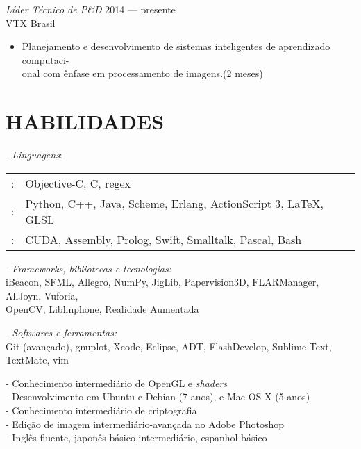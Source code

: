 \documentclass[]{res} %
\newcommand{\sbt}{\,\begin{picture}(-1,1)(-2,-3)\circle*{2}\end{picture}\ }
\def \divspace{6pt}
\def \myitemback{0.55cm}
\def \myitemsep{0pt}
\def \mypositionface{\sl}
\def \myorgface{\sc}
\begin{document}
\begin{resume}
{\mypositionface Líder Técnico de P\&D} \hfill 2014 — presente \\
{\myorgface VTX Brasil}

\begin{itemize}[itemsep=\myitemsep,leftmargin=\myitemback]
\item[\sbt] Planejamento e desenvolvimento de sistemas inteligentes de aprendizado computaci-\\onal com ênfase em processamento de imagens.\hfill(2 meses)
\end{itemize}


\section{HABILIDADES \hspace{\divspace} }

- {\sl Linguagens}: \\
\setlength\tabcolsep{2pt}
\begin{tabular}{l l}
\hspace*{1em}{\it Fluente}:& Objective-C, C, regex \\
\hspace*{1em}{\it Muito Familiar}:& Python, C++, Java, Scheme, Erlang, ActionScript 3, \LaTeX, GLSL \\
\hspace*{1em}{\it Pouco Familiar}:& CUDA, Assembly, Prolog, Swift, Smalltalk, Pascal, Bash \\
\end{tabular}

- {\sl Frameworks, bibliotecas e tecnologias:} \\
\hspace*{1em}iBeacon, SFML, Allegro, NumPy, JigLib, Papervision3D, FLARManager, AllJoyn, Vuforia, \\
\hspace*{1em}OpenCV, Liblinphone, Realidade Aumentada

- {\sl Softwares e ferramentas:} \\
\hspace*{1em} Git (avançado), gnuplot, Xcode, Eclipse, ADT, FlashDevelop, Sublime Text, TextMate, vim

- Conhecimento intermediário de OpenGL e {\it shaders} \\
- Desenvolvimento em Ubuntu e Debian (7 anos), e Mac OS X (5 anos) \\
- Conhecimento intermediário de criptografia \\
- Edição de imagem intermediário-avançada no Adobe Photoshop \\
- Inglês fluente, japonês básico-intermediário, espanhol básico \\



\end{resume}
\end{document}
